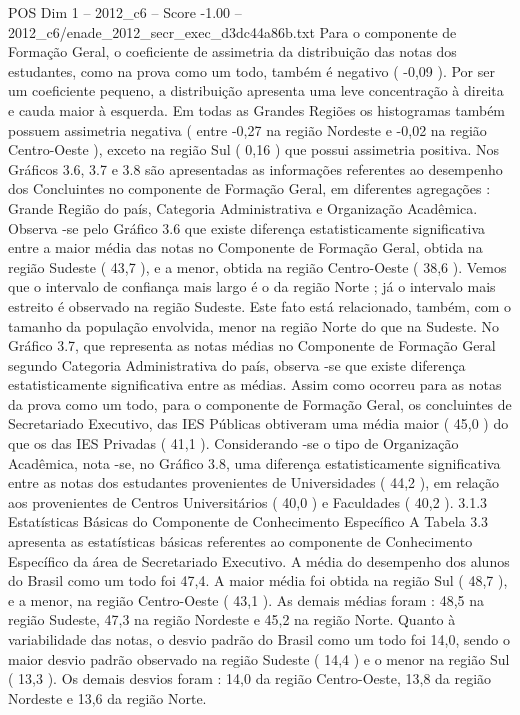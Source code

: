 \begin{textsample}{POS Dim 1 – 2012\_c6 – Score -1.00 – 2012\_c6/enade\_2012\_secr\_exec\_d3dc44a86b.txt}
Para o componente de Formação Geral, o coeficiente de assimetria da distribuição das notas dos estudantes, como na prova como um todo, também é negativo ( -0,09 ).
Por ser um coeficiente pequeno, a distribuição apresenta uma leve concentração à direita e cauda maior à esquerda.
Em todas as Grandes Regiões os histogramas também possuem assimetria negativa ( entre -0,27 na região Nordeste e -0,02 na região Centro-Oeste ), exceto na região Sul ( 0,16 ) que possui assimetria positiva.
Nos Gráficos 3.6, 3.7 e 3.8 são apresentadas as informações referentes ao desempenho dos Concluintes no componente de Formação Geral, em diferentes agregações : Grande Região do país, Categoria Administrativa e Organização Acadêmica.
Observa -se pelo Gráfico 3.6 que existe diferença estatisticamente significativa entre a maior média das notas no Componente de Formação Geral, obtida na região Sudeste ( 43,7 ), e a menor, obtida na região Centro-Oeste ( 38,6 ).
Vemos que o intervalo de confiança mais largo é o da região Norte ; já o intervalo mais estreito é observado na região Sudeste.
Este fato está relacionado, também, com o tamanho da população envolvida, menor na região Norte do que na Sudeste.
No Gráfico 3.7, que representa as notas médias no Componente de Formação Geral segundo Categoria Administrativa do país, observa -se que existe diferença estatisticamente significativa entre as médias.
Assim como ocorreu para as notas da prova como um todo, para o componente de Formação Geral, os concluintes de Secretariado Executivo, das IES Públicas obtiveram uma média maior ( 45,0 ) do que os das IES Privadas ( 41,1 ).
Considerando -se o tipo de Organização Acadêmica, nota -se, no Gráfico 3.8, uma diferença estatisticamente significativa entre as notas dos estudantes provenientes de Universidades ( 44,2 ), em relação aos provenientes de Centros Universitários ( 40,0 ) e Faculdades ( 40,2 ). 3.1.3 Estatísticas Básicas do Componente de Conhecimento Específico A Tabela 3.3 apresenta as estatísticas básicas referentes ao componente de Conhecimento Específico da área de Secretariado Executivo.
A média do desempenho dos alunos do Brasil como um todo foi 47,4.
A maior média foi obtida na região Sul ( 48,7 ), e a menor, na região Centro-Oeste ( 43,1 ).
As demais médias foram : 48,5 na região Sudeste, 47,3 na região Nordeste e 45,2 na região Norte.
Quanto à variabilidade das notas, o desvio padrão do Brasil como um todo foi 14,0, sendo o maior desvio padrão observado na região Sudeste ( 14,4 ) e o menor na região Sul ( 13,3 ).
Os demais desvios foram : 14,0 da região Centro-Oeste, 13,8 da região Nordeste e 13,6 da região Norte.

\end{textsample}
